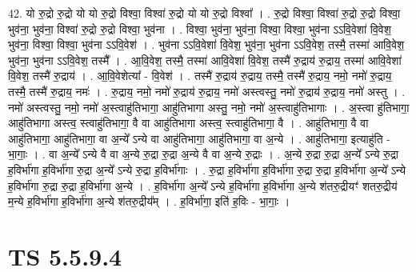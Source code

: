 \documentclass[17pt]{extarticle}
\begin{document}
42. यो रु॒द्रो रु॒द्रो यो यो रु॒द्रो विश्वा॒ विश्वा॑ रु॒द्रो यो यो रु॒द्रो विश्वा᳚ । . रु॒द्रो विश्वा॒ विश्वा॑ रु॒द्रो रु॒द्रो विश्वा॒ भुव॑ना॒ भुव॑ना॒ विश्वा॑ रु॒द्रो रु॒द्रो विश्वा॒ भुव॑ना । . विश्वा॒ भुव॑ना॒ भुव॑ना॒ विश्वा॒ विश्वा॒ भुव॑ना ऽऽवि॒वेशा॑ वि॒वेश॒ भुव॑ना॒ विश्वा॒ विश्वा॒ भुव॑ना ऽऽवि॒वेश॑ । . भुव॑ना ऽऽवि॒वेशा॑ वि॒वेश॒ भुव॑ना॒ भुव॑ना ऽऽवि॒वेश॒ तस्मै॒ तस्मा॑ आवि॒वेश॒ भुव॑ना॒ भुव॑ना ऽऽवि॒वेश॒ तस्मै᳚ । . आ॒वि॒वेश॒ तस्मै॒ तस्मा॑ आवि॒वेशा॑ वि॒वेश॒ तस्मै॑ रु॒द्राय॑ रु॒द्राय॒ तस्मा॑ आवि॒वेशा॑ वि॒वेश॒ तस्मै॑ रु॒द्राय॑ । . आ॒वि॒वेशेत्या᳚ - वि॒वेश॑ । . तस्मै॑ रु॒द्राय॑ रु॒द्राय॒ तस्मै॒ तस्मै॑ रु॒द्राय॒ नमो॒ नमो॑ रु॒द्राय॒ तस्मै॒ तस्मै॑ रु॒द्राय॒ नमः॑ । . रु॒द्राय॒ नमो॒ नमो॑ रु॒द्राय॑ रु॒द्राय॒ नमो॑ अस्त्वस्तु॒ नमो॑ रु॒द्राय॑ रु॒द्राय॒ नमो॑ अस्तु । . नमो॑ अस्त्वस्तु॒ नमो॒ नमो॑ अ॒स्त्वाहु॑तिभागा॒ आहु॑तिभागा अस्तु॒ नमो॒ नमो॑ अ॒स्त्वाहु॑तिभागाः । . अ॒स्त्वा हु॑तिभागा॒ आहु॑तिभागा अस्त्व॒ स्त्वाहु॑तिभागा॒ वै वा आहु॑तिभागा अस्त्व॒ स्त्वाहु॑तिभागा॒ वै । . आहु॑तिभागा॒ वै वा आहु॑तिभागा॒ आहु॑तिभागा॒ वा अ॒न्ये᳚ ऽन्ये वा आहु॑तिभागा॒ आहु॑तिभागा॒ वा अ॒न्ये । . आहु॑तिभागा॒ इत्याहु॑ति - भा॒गाः॒ । . वा अ॒न्ये᳚ ऽन्ये वै वा अ॒न्ये रु॒द्रा रु॒द्रा अ॒न्ये वै वा अ॒न्ये रु॒द्राः । . अ॒न्ये रु॒द्रा रु॒द्रा अ॒न्ये᳚ ऽन्ये रु॒द्रा ह॒विर्भा॑गा ह॒विर्भा॑गा रु॒द्रा अ॒न्ये᳚ ऽन्ये रु॒द्रा ह॒विर्भा॑गाः । . रु॒द्रा ह॒विर्भा॑गा ह॒विर्भा॑गा रु॒द्रा रु॒द्रा ह॒विर्भा॑गा अ॒न्ये᳚ ऽन्ये ह॒विर्भा॑गा रु॒द्रा रु॒द्रा ह॒विर्भा॑गा अ॒न्ये । . ह॒विर्भा॑गा अ॒न्ये᳚ ऽन्ये ह॒विर्भा॑गा ह॒विर्भा॑गा अ॒न्ये श॑तरु॒द्रीयꣳ॑ शतरु॒द्रीय॑ म॒न्ये ह॒विर्भा॑गा ह॒विर्भा॑गा अ॒न्ये श॑तरु॒द्रीय᳚म् । . ह॒विर्भा॑गा॒ इति॑ ह॒विः - भा॒गाः॒ । \newline
\pagebreak
{}

\section{ TS 5.5.9.4 }
\end{document}
